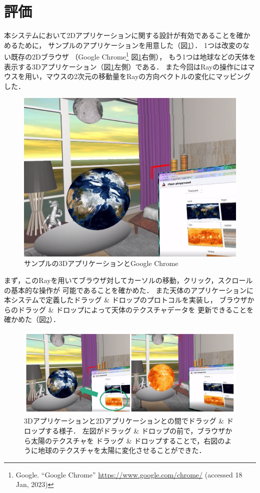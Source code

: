 \section{評価}

本システムにおいて2Dアプリケーションに関する設計が有効であることを確かめるために，
サンプルのアプリケーションを用意した（図\ref{fig:dnd-apps}）．
1つは改変のない既存の2Dブラウザ
（Google Chrome\footnote{Google. ``Google Chrome'' \url{https://www.google.com/chrome/} (accessed 18 Jan, 2023)}
図\ref{fig:dnd-apps}右側），
もう1つは地球などの天体を表示する3Dアプリケーション（図\ref{fig:dnd-apps}左側）である．
また今回はRayの操作にはマウスを用い，マウスの2次元の移動量をRayの方向ベクトルの変化にマッピングした．

\begin{figure}[htbp]
  \centering
  \includegraphics[keepaspectratio, width=0.9\linewidth]{figures/dnd-apps.png}
  \caption{
    サンプルの3DアプリケーションとGoogle Chrome
  }
  \label{fig:dnd-apps}
\end{figure}

まず，このRayを用いてブラウザ対してカーソルの移動，クリック，スクロールの基本的な操作が
可能であることを確かめた．
また天体のアプリケーションに本システムで定義したドラッグ \& ドロップのプロトコルを実装し，
ブラウザからのドラッグ \& ドロップによって天体のテクスチャデータを
更新できることを確かめた（図\ref{fig:dnd}）．

\begin{figure}[htbp]
  \centering
  \includegraphics[keepaspectratio, width=\linewidth]{figures/dnd.png}
  \caption{
    3Dアプリケーションと2Dアプリケーションとの間でドラッグ \& ドロップする様子．
    左図がドラッグ \& ドロップの前で，ブラウザから太陽のテクスチャを
    ドラッグ \& ドロップすることで，右図のように地球のテクスチャを太陽に変化させることができた．
  }
  \label{fig:dnd}
\end{figure}

